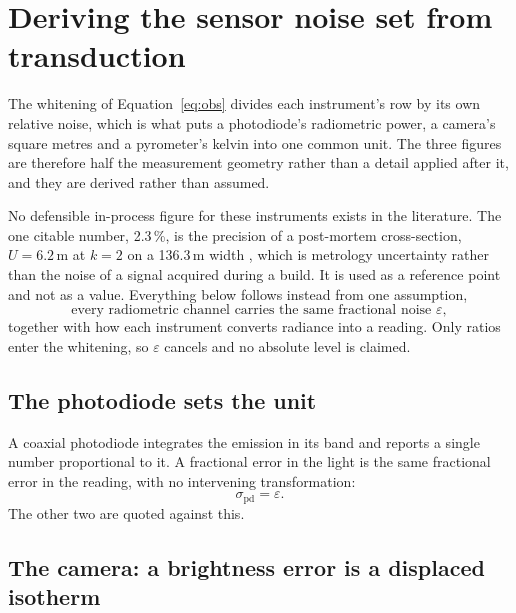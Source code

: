 \documentclass[preprint,12pt]{elsarticle}
\begin{document}
\appendix

\section{Deriving the sensor noise set from transduction}
\label{app:noise}

The whitening of Equation~\eqref{eq:obs} divides each instrument's row by its
own relative noise, which is what puts a photodiode's radiometric power, a
camera's square metres and a pyrometer's kelvin into one common unit. The three
figures are therefore half the measurement geometry rather than a detail applied
after it, and they are derived rather than assumed.

No defensible in-process figure for these instruments exists in the literature.
The one citable number, 2.3\,\%, is the precision of a post-mortem
cross-section, $U = 6.2$\,\textmu m at $k=2$ on a 136.3\,\textmu m width
\cite{Weaver2024}, which is metrology uncertainty rather than the noise of a
signal acquired during a build. It is used as a reference point and not as a
value. Everything below follows instead from one assumption,
%
\begin{equation}
\text{every radiometric channel carries the same fractional noise }
\varepsilon ,
\label{eq:eps}
\end{equation}
%
together with how each instrument converts radiance into a reading. Only ratios
enter the whitening, so $\varepsilon$ cancels and no absolute level is claimed.

\subsection{The photodiode sets the unit}

A coaxial photodiode integrates the emission in its band and reports a single
number proportional to it. A fractional error in the light is the same
fractional error in the reading, with no intervening transformation:
%
\begin{equation}
\sigma_{\mathrm{pd}} = \varepsilon .
\end{equation}
%
The other two are quoted against this.

\subsection{The camera: a brightness error is a displaced isotherm}
\end{document}
